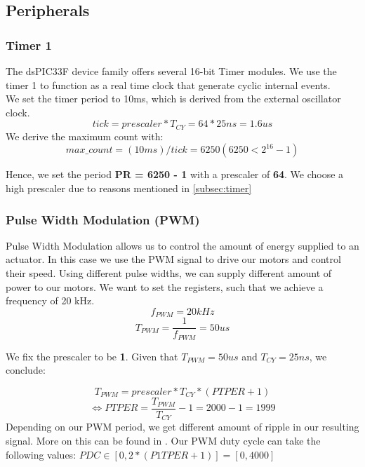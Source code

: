 \subsection{Peripherals}
\subsubsection*{Timer 1}
The dsPIC33F device family offers several 16-bit Timer modules. We use the timer 1 to function as a real time clock that generate cyclic internal events.\\
We set the timer period to 10ms, which is derived from the external oscillator clock.
$$tick=prescaler*T_{CY}= 64*25ns= 1.6us $$
We derive the maximum count with:
$$max\_count=(10 ms)/tick=6250 (6250<2^{16}-1)$$

Hence, we set the period \textbf{PR = 6250 - 1} with a prescaler of \textbf{64}. We choose a high prescaler due to reasons mentioned in \ref{subsec:timer}

\subsubsection*{Pulse Width Modulation (PWM)}

Pulse Width Modulation allows us to control the amount of energy supplied to an actuator. In this case we use the PWM signal to drive our motors and control their speed. Using different pulse widths, we can supply different amount of power to our motors. \cite{alex}
\vskip 0.1in
\noindent
We want to set the registers, such that we achieve a frequency of 20 kHz.
$$f_{PWM} = 20 kHz$$
$$T_{PWM} = \frac{1}{f_{PWM}} = 50 us$$

We fix the prescaler to be \textbf{1}. Given that $T_{PWM} = 50 us$ and $T_{CY}=25 ns$, we conclude:

$$T_{PWM} = prescaler * T_{CY} * (PTPER + 1)$$
$$\iff PTPER = \frac{T_{PWM}}{T_{CY}} - 1  = 2000 - 1 = 1999$$
\vskip 0.1in
\noindent
Depending on our PWM period, we get different amount of ripple in our resulting signal. More on this can be found in \cite[Chapter~5.1]{alex}.
\vskip 0.1in
\noindent
Our PWM duty cycle can take the following values: $PDC \in [0, 2*(P1TPER + 1)] = [0, 4000]$


